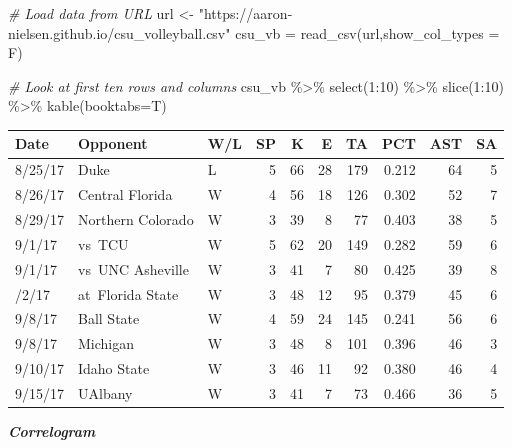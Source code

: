 \documentclass[
  11pt,
]{book}
\newenvironment{Shaded}{\begin{snugshade}}{\end{snugshade}}
\newcommand{\AttributeTok}[1]{\textcolor[rgb]{0.77,0.63,0.00}{#1}}
\newcommand{\CommentTok}[1]{\textcolor[rgb]{0.56,0.35,0.01}{\textit{#1}}}
\newcommand{\DecValTok}[1]{\textcolor[rgb]{0.00,0.00,0.81}{#1}}
\newcommand{\FunctionTok}[1]{\textcolor[rgb]{0.00,0.00,0.00}{#1}}
\newcommand{\NormalTok}[1]{#1}
\newcommand{\OtherTok}[1]{\textcolor[rgb]{0.56,0.35,0.01}{#1}}
\newcommand{\SpecialCharTok}[1]{\textcolor[rgb]{0.00,0.00,0.00}{#1}}
\newcommand{\StringTok}[1]{\textcolor[rgb]{0.31,0.60,0.02}{#1}}
\theoremstyle{definition}
\theoremstyle{definition}
\theoremstyle{definition}
\theoremstyle{definition}
\theoremstyle{remark}
\begin{document}
\begin{Shaded}
\begin{Highlighting}[]
\CommentTok{\# Load data from URL}
\NormalTok{url }\OtherTok{\textless{}{-}} \StringTok{"https://aaron{-}nielsen.github.io/csu\_volleyball.csv"}
\NormalTok{csu\_vb }\OtherTok{=} \FunctionTok{read\_csv}\NormalTok{(url,}\AttributeTok{show\_col\_types =}\NormalTok{ F)}

\CommentTok{\# Look at first ten rows and columns}
\NormalTok{csu\_vb }\SpecialCharTok{\%\textgreater{}\%} \FunctionTok{select}\NormalTok{(}\DecValTok{1}\SpecialCharTok{:}\DecValTok{10}\NormalTok{) }\SpecialCharTok{\%\textgreater{}\%} \FunctionTok{slice}\NormalTok{(}\DecValTok{1}\SpecialCharTok{:}\DecValTok{10}\NormalTok{) }\SpecialCharTok{\%\textgreater{}\%} \FunctionTok{kable}\NormalTok{(}\AttributeTok{booktabs=}\NormalTok{T)}
\end{Highlighting}
\end{Shaded}

\begin{tabular}{lllrrrrrrr}
\toprule
Date & Opponent & W/L & SP & K & E & TA & PCT & AST & SA\\
\midrule
8/25/17 & Duke & L & 5 & 66 & 28 & 179 & 0.212 & 64 & 5\\
8/26/17 & Central Florida & W & 4 & 56 & 18 & 126 & 0.302 & 52 & 7\\
8/29/17 & Northern Colorado & W & 3 & 39 & 8 & 77 & 0.403 & 38 & 5\\
9/1/17 & vs TCU & W & 5 & 62 & 20 & 149 & 0.282 & 59 & 6\\
9/1/17 & vs UNC Asheville & W & 3 & 41 & 7 & 80 & 0.425 & 39 & 8\\
\addlinespace
9/2/17 & at Florida State & W & 3 & 48 & 12 & 95 & 0.379 & 45 & 6\\
9/8/17 & Ball State & W & 4 & 59 & 24 & 145 & 0.241 & 56 & 6\\
9/8/17 & Michigan & W & 3 & 48 & 8 & 101 & 0.396 & 46 & 3\\
9/10/17 & Idaho State & W & 3 & 46 & 11 & 92 & 0.380 & 46 & 4\\
9/15/17 & UAlbany & W & 3 & 41 & 7 & 73 & 0.466 & 36 & 5\\
\bottomrule
\end{tabular}

\newpage

\textbf{\emph{Correlogram}}
\end{document}
